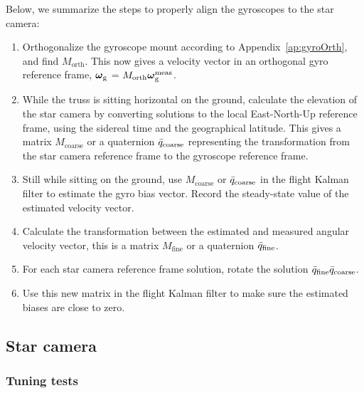 Below, we summarize the steps to properly align the gyroscopes to the star camera:
\begin{enumerate}
 \item Orthogonalize the gyroscope mount according to Appendix~\ref{ap:gyroOrth}, and find $M_\textrm{orth}$. This now gives a velocity vector in an orthogonal gyro reference frame, $\boldsymbol\omega_{\textrm{g}}$ = $M_\textrm{orth}\boldsymbol\omega_{\textrm{g}}^\textrm{meas}$. 
 \item While the truss is sitting horizontal on the ground, calculate the elevation of the star camera by converting solutions to the local East-North-Up reference frame, using the sidereal time and the geographical latitude. This gives a matrix $M_\textrm{coarse}$  or a quaternion $\bar{q}_\textrm{coarse}$ representing the transformation from the star camera reference frame to the gyroscope reference frame.
\item Still while sitting on the ground, use $M_\textrm{coarse}$ or $\bar{q}_\textrm{coarse}$ in the flight Kalman filter to estimate the gyro bias vector. Record the steady-state value of the estimated velocity vector.
 \item Calculate the transformation between the estimated and measured angular velocity vector, this is a matrix $M_\textrm{fine}$ or a quaternion $\bar{q}_\textrm{fine}$.
 \item For each star camera reference frame solution, rotate the solution $\bar{q}_\textrm{fine}\bar{q}_\textrm{coarse}$.
 \item Use this new matrix in the flight Kalman filter to make sure the estimated biases are close to zero. 
 \end{enumerate} 
\subsection{Star camera}

\subsubsection{Tuning tests}

